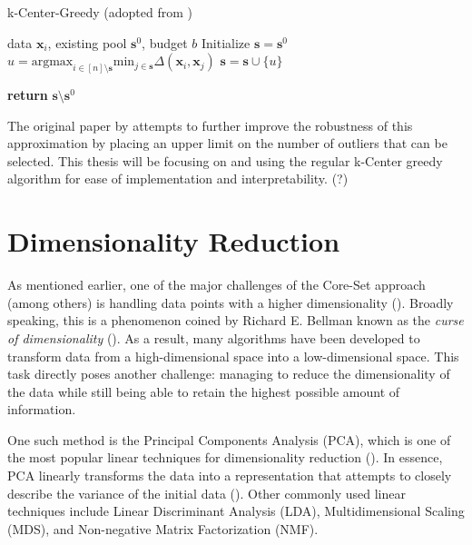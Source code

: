 \documentclass[english,bachelor,ul]{webisthesis} %
\begin{document}
\begin{algorithm}
    \caption{k-Center-Greedy (adopted from \cite{DBLP:conf/iclr/SenerS18})}%
\makeatletter{}\makeatother
\label{alg:coreset}
\begin{algorithmic}


\Require data $ \mathbf{x}_i $, existing pool $ \mathbf{s}^0 $, budget $ b $
\State Initialize $ \mathbf{s} = \mathbf{s}^0 $
\Repeat
\State $ u = \text{argmax}_{i \in [n] \setminus \mathbf{s}} \text{min}_{j \in \mathbf{s}} \Delta(\mathbf{x}_i, \mathbf{x}_j) $
\State $ \mathbf{s} = \mathbf{s} \cup \{u\} $

\State \textbf{return} $\mathbf{s} \setminus \mathbf{s}^0 $
\end{algorithmic}
\end{algorithm}

The original paper by \cite{DBLP:conf/iclr/SenerS18} attempts to further improve the robustness of this approximation by placing an upper limit on the number of outliers that can be selected. This thesis will be focusing on and using the regular k-Center greedy algorithm for ease of implementation and interpretability. (?)

\section{Dimensionality Reduction}

As mentioned earlier, one of the major challenges of the Core-Set approach (among others) is handling data points with a higher dimensionality (\cite{DBLP:conf/iccv/SinhaED19}). Broadly speaking, this is a phenomenon coined by Richard E. Bellman known as the \textit{curse of dimensionality} (\cite{franccois2007high}). As a result, many algorithms have been developed to transform data from a high-dimensional space into a low-dimensional space. This task directly poses another challenge: managing to reduce the dimensionality of the data while still being able to retain the highest possible amount of information. 

One such method is the Principal Components Analysis (PCA), which is one of the most popular linear techniques for dimensionality reduction (\cite{van2009dimensionality}). In essence, PCA linearly transforms the data into a representation that attempts to closely describe the variance of the initial data (\cite{jolliffe2016principal}). Other commonly used linear techniques include Linear Discriminant Analysis (LDA), Multidimensional Scaling (MDS), and Non-negative Matrix Factorization (NMF).
\end{document}
